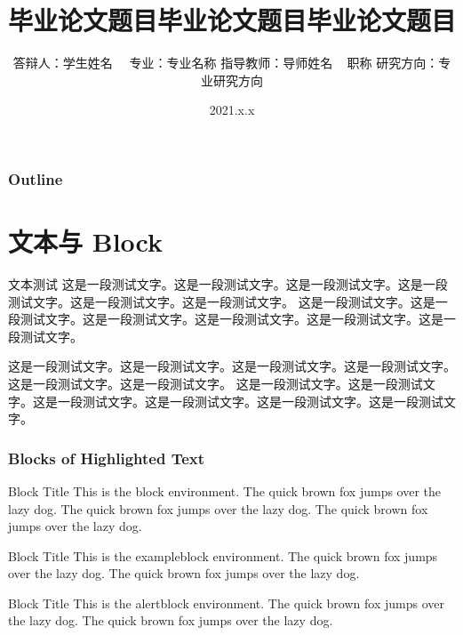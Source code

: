 \documentclass[notheorems,11pt,compress]{beamer}
\title[论文题目]{毕业论文题目毕业论文题目毕业论文题目}
\author[学生姓名]
{
    答辩人：学生姓名~~ \vskip 3mm
    专业：专业名称 \vskip 3mm
    指导教师：导师姓名 ~ 职称 \vskip 3mm
    研究方向：专业研究方向
}
\institute[学校名称]{}
\date[2021.x.x]{2021.x.x}
\numberwithin{figure}{section}
\numberwithin{table}{section}
\numberwithin{equation}{section}
\numberwithin{theorem}{section}
\numberwithin{definition}{section}
\numberwithin{lemma}{section}
\numberwithin{proposition}{section}
\numberwithin{corollary}{section}
\theoremstyle{example}
\begin{document}
\begin{frame}
\titlepage
\end{frame}

\begin{frame}
\frametitle{Outline}
\vskip -5.6pt
\hspace*{1.5em}
\parbox[t]{.95\textwidth}{
  \begin{minipage}[c][0.6\textheight]{\textwidth}
  \tableofcontents
  \end{minipage}
}
\end{frame}


\section{文本与 Block}

\begin{frame}{文本测试}
这是一段测试文字。这是一段测试文字。这是一段测试文字。这是一段测试文字。这是一段测试文字。这是一段测试文字。
这是一段测试文字。这是一段测试文字。这是一段测试文字。这是一段测试文字。这是一段测试文字。这是一段测试文字。

\vspace{1ex}
这是一段测试文字。这是一段测试文字。这是一段测试文字。这是一段测试文字。这是一段测试文字。这是一段测试文字。
这是一段测试文字。这是一段测试文字。这是一段测试文字。这是一段测试文字。这是一段测试文字。这是一段测试文字。

\end{frame}


\begin{frame}
\frametitle{Blocks of Highlighted Text}
\begin{block}{Block Title}
This is the block environment. The quick brown fox jumps over the lazy dog. The quick brown fox jumps over the lazy dog. The quick brown fox jumps over the lazy dog.
\end{block}

\begin{exampleblock}{Block Title}
This is the exampleblock environment. The quick brown fox jumps over the lazy dog. The quick brown fox jumps over the lazy dog.
\end{exampleblock}

\begin{alertblock}{Block Title}
This is the alertblock environment. The quick brown fox jumps over the lazy dog. The quick brown fox jumps over the lazy dog.
\end{alertblock}
\end{frame}
\end{document}
